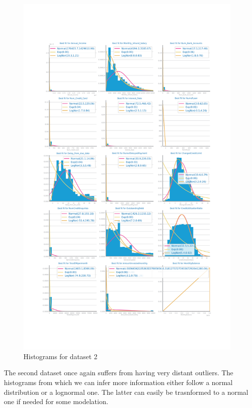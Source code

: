 \documentclass[10pt]{extarticle}
\begin{document}
\begin{figure}[H]
\centering\includegraphics[scale=0.6]{images/dataset2/data_profiling/Credit_Score_histogram_numeric_distribution.png}
\caption{Histograms for dataset 2} %
\end{figure}
The second dataset once again suffers from having very distant outliers. The histograms from which we can infer more information
either follow a normal distribution or a lognormal one. The latter can easily be trasnformed to a normal one if needed for some modelation.
\end{document}
